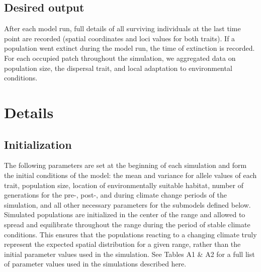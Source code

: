 \documentclass[12pt, oneside]{article}
\begin{document}
\subsection*{Desired output} 
After each model run, full details of all surviving individuals at the last time point are recorded (spatial coordinates and loci values for both traits). If a population went extinct during the model run, the time of extinction is recorded. For each occupied patch throughout the simulation, we aggregated data on population size, the dispersal trait, and local adaptation to environmental conditions. 

\section*{Details}
\subsection*{Initialization} 
The following parameters are set at the beginning of each simulation and form the initial conditions of the model: the mean and variance for allele values of each trait, population size, location of environmentally suitable habitat, number of generations for the pre-, post-, and during climate change periods of the simulation, and all other necessary parameters for the submodels defined below. Simulated populations are initialized in the center of the range and allowed to spread and equilibrate throughout the range during the period of stable climate conditions. This ensures that the populations reacting to a changing climate truly represent the expected spatial distribution for a given range, rather than the initial parameter values used in the simulation. See Tables A1 \& A2 for a full list of parameter values used in the simulations described here.
\end{document}
